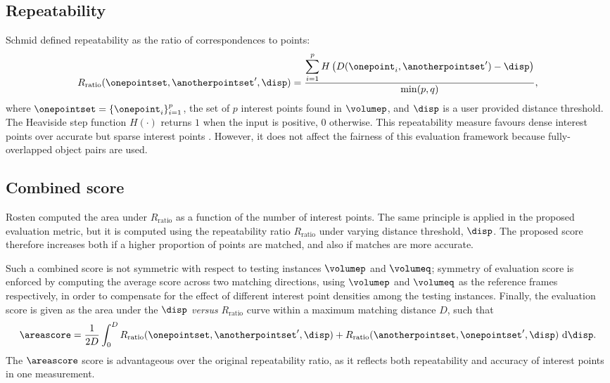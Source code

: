 \subsection{Repeatability}
Schmid \etal \cite{Schmid2000} defined repeatability as the ratio of correspondences to points:
\begin{equation}
R_\textrm{ratio}(\onepointset, \anotherpointset', \disp) = \frac{\displaystyle\sum_{i=1}^p H\left(D(\onepoint_i, \anotherpointset') - \disp\right)}{\min(p, q)},
\label{eqn/eval/repeatratio}
\end{equation}
where $\onepointset = \{\onepoint_i\}_{i=1}^{p}$, the set of $p$ interest points found in $\volumep$, and $\disp$ is a user provided distance threshold. 
The Heaviside step function $H(\cdot)$ returns $1$ when the input is positive, $0$ otherwise.
This repeatability measure favours dense interest points over accurate but sparse interest points \cite{Willis2009}. 
However, it does not affect the fairness of this evaluation framework because fully-overlapped object pairs are used.

\subsection{Combined score}
Rosten \etal \cite{Rosten2010} computed the area under $R_\textrm{ratio}$ as a function of the number of interest points. 
The same principle is applied in the proposed evaluation metric, but it is computed using the repeatability ratio $R_\textrm{ratio}$ under varying distance threshold, $\disp$.  
The proposed score therefore increases both if a higher proportion of points are matched, and also if matches are more accurate. 

Such a combined score is not symmetric with respect to testing instances $\volumep$ and $\volumeq$; symmetry of evaluation score is enforced by computing the average score across two matching directions, using $\volumep$ and $\volumeq$ as the reference frames respectively, in order to compensate for the effect of different interest point densities among the testing instances. Finally, the evaluation score is given as the area under the $\disp$ \textit{versus} $R_\textrm{ratio}$ curve within a maximum matching distance $D$, such that  
\begin{equation}
\areascore=\frac{1}{2D}\int_{0}^{D}R_\textrm{ratio}(\onepointset, \anotherpointset', \disp) + R_\textrm{ratio}(\anotherpointset, \onepointset', \disp) ~ \textrm{d}\disp.
\label{eqn/eval/rptarea}
\end{equation}
The $\areascore$ score is advantageous over the original repeatability ratio, as it reflects both repeatability and accuracy of interest points in one measurement. 


